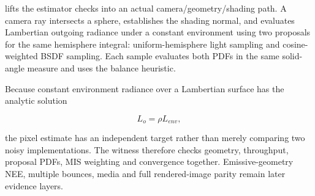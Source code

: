 \hypertarget{appendix-ca8898faf1a6-scene-level-mis-witness}{}

 lifts the estimator checks into an actual camera/geometry/shading path. A camera ray intersects a sphere, establishes the shading normal, and evaluates Lambertian outgoing radiance under a constant environment using two proposals for the same hemisphere integral: uniform-hemisphere light sampling and cosine-weighted BSDF sampling. Each sample evaluates both PDFs in the same solid-angle measure and uses the balance heuristic.

Because constant environment radiance over a Lambertian surface has the analytic solution

\[
L_o = \rho L_{env},
\]

the pixel estimate has an independent target rather than merely comparing two noisy implementations. The witness therefore checks geometry, throughput, proposal PDFs, MIS weighting and convergence together. Emissive-geometry NEE, multiple bounces, media and full rendered-image parity remain later evidence layers.
